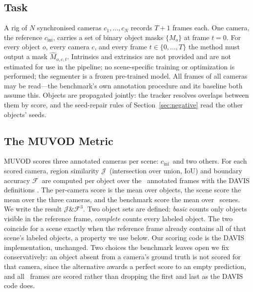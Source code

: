 \documentclass[journal]{IEEEtran}
\newcommand{\Jscore}{\ensuremath{\mathcal{J}}}
\newcommand{\Fscore}{\ensuremath{\mathcal{F}}}
\newcommand{\JF}{\ensuremath{\mathcal{J}\&\mathcal{F}^{3}}}
\newcommand{\cini}{\ensuremath{c_{\mathrm{ini}}}}
\begin{document}
\subsection{Task}
A rig of $N$ synchronised cameras $c_{1},\dots,c_{N}$ records $T+1$ frames
each. One camera, the reference \cini, carries a set of binary object masks
$\{M_{o}\}$ at frame $t=0$. For every object $o$, every camera $c$, and every
frame $t\in\{0,\dots,T\}$ the method must output a mask $\hat{M}_{o,c,t}$.
Intrinsics and extrinsics are not provided and are not estimated for use in
the pipeline; no scene-specific training or optimization is performed; the
segmenter is a frozen pre-trained model. All frames of all cameras may be
read---the benchmark's own annotation procedure and its baseline both assume
this. Objects are propagated jointly: the tracker resolves overlaps between
them by score, and the seed-repair rules of Section~\ref{sec:negative} read the
other objects' seeds.

\subsection{The MUVOD Metric}
MUVOD scores three annotated cameras per scene: \cini\ and two others.
For each scored camera, region similarity \Jscore\ (intersection over union,
IoU) and boundary accuracy \Fscore\ are computed per object over the
\nFramesPerCam\ annotated frames with the DAVIS definitions \cite{davis2016}.
The per-camera score is the mean over objects, the scene score the mean over
the three cameras, and the benchmark score the mean over \nScenes\ scenes.
We write the result \JF. Two object sets are defined: \emph{basic} counts only
objects visible in the reference frame, \emph{complete} counts every labeled
object. The two coincide for a scene exactly when the reference frame already
contains all of that scene's labeled objects, a property we use below. Our
scoring code is the DAVIS implementation, unchanged. Two choices the benchmark
leaves open we fix conservatively: an object absent from a camera's ground
truth is not scored for that camera, since the alternative awards a perfect
score to an empty prediction, and all \nFramesPerCam\ frames are scored rather
than dropping the first and last as the DAVIS code does.
\end{document}
